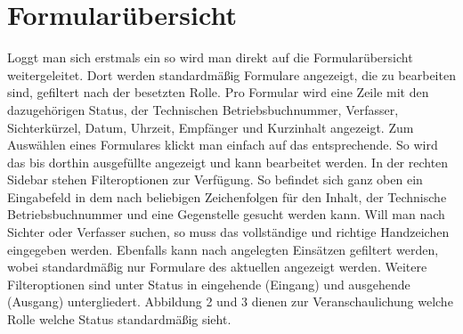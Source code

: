 \documentclass[a4paper,11pt,oneside, titlepage]{article}
\begin{document}
	\section{Formularübersicht}
	Loggt man sich erstmals ein so wird man direkt auf die Formularübersicht weitergeleitet. Dort werden standardmäßig Formulare angezeigt, die zu bearbeiten sind, gefiltert nach der besetzten Rolle.
	Pro Formular wird eine Zeile mit den dazugehörigen Status, der Technischen Betriebsbuchnummer, Verfasser, Sichterkürzel, Datum, Uhrzeit, Empfänger und Kurzinhalt angezeigt. Zum Auswählen eines Formulares klickt man einfach auf das entsprechende. So wird das bis dorthin ausgefüllte angezeigt und kann bearbeitet werden.
	\newline
	\newline
	In der rechten Sidebar stehen Filteroptionen zur Verfügung. So befindet sich ganz oben ein Eingabefeld in dem nach beliebigen Zeichenfolgen für den Inhalt, der Technische Betriebsbuchnummer und eine Gegenstelle gesucht werden kann. Will man nach Sichter oder Verfasser suchen, so muss das vollständige und richtige Handzeichen eingegeben werden. Ebenfalls kann nach angelegten Einsätzen gefiltert werden, wobei standardmäßig nur Formulare des aktuellen angezeigt werden.
	\newline
	Weitere Filteroptionen sind unter \glqq{}Status \grqq{} in eingehende (\glqq{}Eingang\grqq{}) und ausgehende (\glqq{}Ausgang\grqq{}) untergliedert. Abbildung 2 und 3 dienen zur Veranschaulichung welche Rolle welche Status standardmäßig sieht. 
\end{document}
